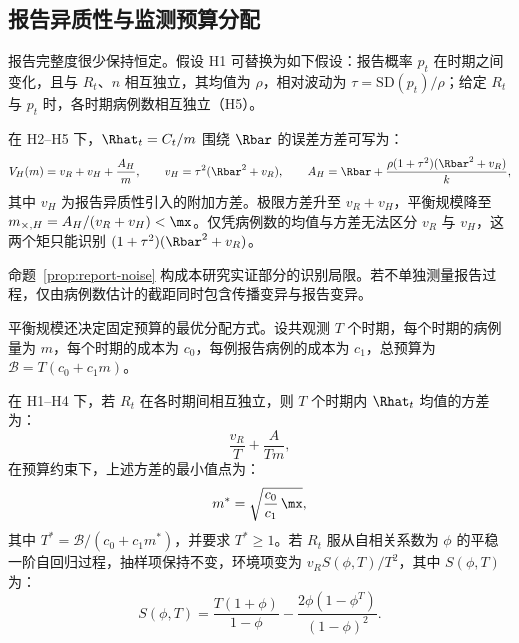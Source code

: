 \subsection{报告异质性与监测预算分配}
\label{sec:bg-reporting}

报告完整度很少保持恒定。假设 H1 可替换为如下假设：报告概率 $p_t$ 在时期之间变化，且与 $R_t$、$n$ 相互独立，其均值为 $\rho$，相对波动为 $\tau=\mathrm{SD}(p_t)/\rho$；给定 $R_t$ 与 $p_t$ 时，各时期病例数相互独立（H5）。

\begin{proposition}[报告异质性]
\label{prop:report-noise}
在 H2--H5 下，$\Rhat_t=C_t/m$ 围绕 $\Rbar$ 的误差方差可写为：
\begin{equation}
  V_H(m)=v_R+v_H+\frac{A_H}{m},\qquad %
  v_H=\tau^2(\Rbar^2+v_R),\qquad A_H=\Rbar+\frac{\rho(1+\tau^2)(\Rbar^2+v_R)}{k}, %
  \label{eq:vH-AH}
\end{equation}
其中 $v_H$ 为报告异质性引入的附加方差。极限方差升至 $v_R+v_H$，平衡规模降至 $m_{\times,H}=A_H/(v_R+v_H)<\mx$。仅凭病例数的均值与方差无法区分 $v_R$ 与 $v_H$，这两个矩只能识别 $(1+\tau^2)(\Rbar^2+v_R)$。
\end{proposition}

命题~\ref{prop:report-noise} 构成本研究实证部分的识别局限。若不单独测量报告过程，仅由病例数估计的截距同时包含传播变异与报告变异。

平衡规模还决定固定预算的最优分配方式。设共观测 $T$ 个时期，每个时期的病例量为 $m$，每个时期的成本为 $c_0$，每例报告病例的成本为 $c_1$，总预算为 $\mathcal{B}=T(c_0+c_1m)$。

\begin{proposition}[固定预算的分配]
\label{prop:allocation}
在 H1--H4 下，若 $R_t$ 在各时期间相互独立，则 $T$ 个时期内 $\Rhat_t$ 均值的方差为：
\begin{equation}
  \frac{v_R}{T}+\frac{A}{Tm},
  \label{eq:alloc-indep}
\end{equation}
在预算约束下，上述方差的最小值点为：
\begin{equation}
  m^*=\sqrt{\frac{c_0}{c_1}\,\mx},
  \label{eq:optimal-m}
\end{equation}
其中 $T^*=\mathcal{B}/(c_0+c_1m^*)$，并要求 $T^*\ge1$。若 $R_t$ 服从自相关系数为 $\phi$ 的平稳一阶自回归过程，抽样项保持不变，环境项变为 $v_RS(\phi,T)/T^2$，其中 $S(\phi,T)$ 为：
\begin{equation}
  S(\phi,T)=\frac{T(1+\phi)}{1-\phi}-\frac{2\phi(1-\phi^T)}{(1-\phi)^2}.
  \label{eq:ar-sum}
\end{equation}
\end{proposition}

